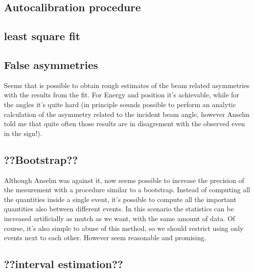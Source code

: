 \subsection{Autocalibration procedure}

\subsection{least square fit}

\subsection{False asymmetries}
Seems that is possible to obtain rough estimates of the beam related asymmetries with the results from the fit. For Energy and position it's achievable, while for the angles it's quite hard (in principle sounds possible to perform an analytic calculation of the asymmetry related to the incident beam angle, however Anselm told me that quite often those results are in disagrement with the observed even in the sign!).  

\subsection{??Bootstrap??}

Although Anselm was against it, now seems possible to increase the precision of the mesurement with a procedure similar to a bootstrap. Instead of computing all the quantities inside a single event, it's possible to compute all the important quantities also between different events. In this scenario the statistics can be increased artificially as mutch as we want, with the same amount of data. Of course, it's also simple to abuse of this method, so we should restrict using only events next to each other. However seem reasonable and promising.

\subsection{??interval estimation??}




